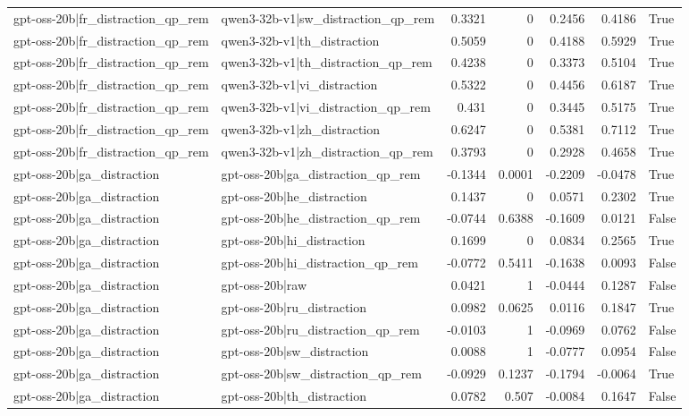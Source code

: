 \begin{table}
\begin{tabular}{l l r r r r l}
gpt-oss-20b|fr_distraction_qp_rem & qwen3-32b-v1|sw_distraction_qp_rem & 0.3321 & 0 & 0.2456 & 0.4186 & True \\
gpt-oss-20b|fr_distraction_qp_rem & qwen3-32b-v1|th_distraction & 0.5059 & 0 & 0.4188 & 0.5929 & True \\
gpt-oss-20b|fr_distraction_qp_rem & qwen3-32b-v1|th_distraction_qp_rem & 0.4238 & 0 & 0.3373 & 0.5104 & True \\
gpt-oss-20b|fr_distraction_qp_rem & qwen3-32b-v1|vi_distraction & 0.5322 & 0 & 0.4456 & 0.6187 & True \\
gpt-oss-20b|fr_distraction_qp_rem & qwen3-32b-v1|vi_distraction_qp_rem & 0.431 & 0 & 0.3445 & 0.5175 & True \\
gpt-oss-20b|fr_distraction_qp_rem & qwen3-32b-v1|zh_distraction & 0.6247 & 0 & 0.5381 & 0.7112 & True \\
gpt-oss-20b|fr_distraction_qp_rem & qwen3-32b-v1|zh_distraction_qp_rem & 0.3793 & 0 & 0.2928 & 0.4658 & True \\
gpt-oss-20b|ga_distraction & gpt-oss-20b|ga_distraction_qp_rem & -0.1344 & 0.0001 & -0.2209 & -0.0478 & True \\
gpt-oss-20b|ga_distraction & gpt-oss-20b|he_distraction & 0.1437 & 0 & 0.0571 & 0.2302 & True \\
gpt-oss-20b|ga_distraction & gpt-oss-20b|he_distraction_qp_rem & -0.0744 & 0.6388 & -0.1609 & 0.0121 & False \\
gpt-oss-20b|ga_distraction & gpt-oss-20b|hi_distraction & 0.1699 & 0 & 0.0834 & 0.2565 & True \\
gpt-oss-20b|ga_distraction & gpt-oss-20b|hi_distraction_qp_rem & -0.0772 & 0.5411 & -0.1638 & 0.0093 & False \\
gpt-oss-20b|ga_distraction & gpt-oss-20b|raw & 0.0421 & 1 & -0.0444 & 0.1287 & False \\
gpt-oss-20b|ga_distraction & gpt-oss-20b|ru_distraction & 0.0982 & 0.0625 & 0.0116 & 0.1847 & True \\
gpt-oss-20b|ga_distraction & gpt-oss-20b|ru_distraction_qp_rem & -0.0103 & 1 & -0.0969 & 0.0762 & False \\
gpt-oss-20b|ga_distraction & gpt-oss-20b|sw_distraction & 0.0088 & 1 & -0.0777 & 0.0954 & False \\
gpt-oss-20b|ga_distraction & gpt-oss-20b|sw_distraction_qp_rem & -0.0929 & 0.1237 & -0.1794 & -0.0064 & True \\
gpt-oss-20b|ga_distraction & gpt-oss-20b|th_distraction & 0.0782 & 0.507 & -0.0084 & 0.1647 & False \\

\end{tabular}
\end{table}
